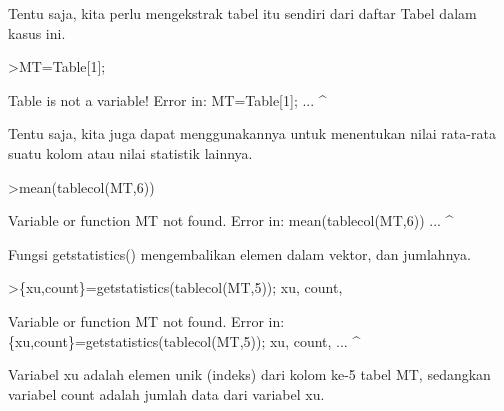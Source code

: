 \documentclass[a4paper,10pt]{article}
\begin{document}
\begin{eulernotebook}
\begin{eulercomment}
\begin{eulercomment}
\begin{eulercomment}
\begin{eulercomment}
\begin{eulercomment}
\begin{eulercomment}
\begin{eulercomment}
\begin{eulercomment}
\begin{eulercomment}
\begin{eulercomment}
\begin{eulercomment}
\begin{eulercomment}
\begin{eulercomment}
\begin{eulercomment}
\begin{eulercomment}
\begin{eulercomment}
\begin{eulercomment}
\begin{eulercomment}
\begin{eulercomment}
Tentu saja, kita perlu mengekstrak tabel itu sendiri dari daftar Tabel
dalam kasus ini.
\end{eulercomment}
\begin{eulerprompt}
>MT=Table[1];
\end{eulerprompt}
\begin{euleroutput}
  Table is not a variable!
  Error in:
  MT=Table[1]; ...
             ^
\end{euleroutput}
\begin{eulercomment}
Tentu saja, kita juga dapat menggunakannya untuk menentukan nilai
rata-rata suatu kolom atau nilai statistik lainnya.
\end{eulercomment}
\begin{eulerprompt}
>mean(tablecol(MT,6))
\end{eulerprompt}
\begin{euleroutput}
  Variable or function MT not found.
  Error in:
  mean(tablecol(MT,6)) ...
                  ^
\end{euleroutput}
\begin{eulercomment}
Fungsi getstatistics() mengembalikan elemen dalam vektor, dan
jumlahnya. 
\end{eulercomment}
\begin{eulerprompt}
>\{xu,count\}=getstatistics(tablecol(MT,5)); xu, count,
\end{eulerprompt}
\begin{euleroutput}
  Variable or function MT not found.
  Error in:
  \{xu,count\}=getstatistics(tablecol(MT,5)); xu, count, ...
                                      ^
\end{euleroutput}
\begin{eulercomment}
Variabel xu adalah elemen unik (indeks) dari kolom ke-5 tabel MT,
sedangkan variabel count adalah jumlah data dari variabel xu.


\end{eulercomment}
\end{eulercomment}
\end{eulercomment}
\end{eulercomment}
\end{eulercomment}
\end{eulercomment}
\end{eulercomment}
\end{eulercomment}
\end{eulercomment}
\end{eulercomment}
\end{eulercomment}
\end{eulercomment}
\end{eulercomment}
\end{eulercomment}
\end{eulercomment}
\end{eulercomment}
\end{eulercomment}
\end{eulercomment}
\end{eulercomment}
\end{eulernotebook}
\end{document}
